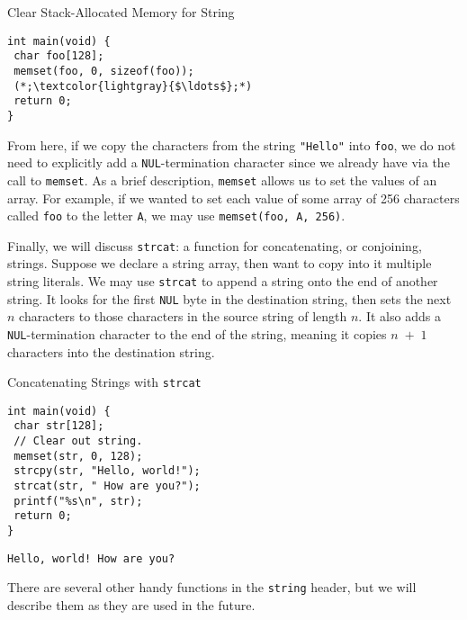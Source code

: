 \begin{cl}[main.c]{Clear Stack-Allocated Memory for String}\begin{lstlisting}[language=MyC]
int main(void) {
 char foo[128];
 memset(foo, 0, sizeof(foo));
 (*;\textcolor{lightgray}{$\ldots$};*)
 return 0;
}
\end{lstlisting}\end{cl}

From here, if we copy the characters from the string \texttt{"Hello"} into \texttt{foo}, we do not need to explicitly add a \texttt{NUL}-termination character since we already have via the call to \texttt{memset}. As a brief description, \texttt{memset} allows us to set the values of an array. For example, if we wanted to set each value of some array of 256 characters called \texttt{foo} to the letter \texttt{\q{}A\q{}}, we may use \texttt{memset(foo, \q{}A\q{}, 256)}.

Finally, we will discuss \texttt{strcat}: a function for concatenating, or conjoining, strings. Suppose we declare a string array, then want to copy into it multiple string literals. We may use \texttt{strcat} to append a string onto the end of another string. It looks for the first \texttt{NUL} byte in the destination string, then sets the next $n$ characters to those characters in the source string of length $n$. It also adds a \texttt{NUL}-termination character to the end of the string, meaning it copies $n\;+\;1$ characters into the destination string.

\begin{cloast}[main.c]{Concatenating Strings with \texttt{strcat}}\begin{lstlisting}[language=MyC]
int main(void) {
 char str[128];
 // Clear out string.
 memset(str, 0, 128); 
 strcpy(str, "Hello, world!");
 strcat(str, " How are you?");
 printf("%s\n", str);
 return 0;
}
\end{lstlisting}
\tcblower
\begin{lstlisting}[language=MyOutput]
Hello, world! How are you?
\end{lstlisting}
\end{cloast}

There are several other handy functions in the \texttt{string} header, but we will describe them as they are used in the future.


